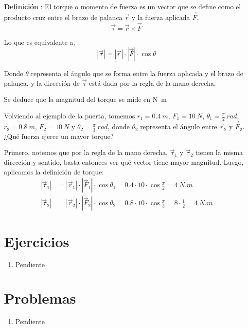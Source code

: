 \documentclass[letterpaper]{article}
\newcounter{definiciones}
\newcommand{\defii}{\stepcounter{definiciones} \textbf{Definición \thedefiniciones}: }
\newenvironment{defi}{\begin{framed} \defii}{\end{framed}}
\begin{document}
\begin{defi}
El torque o momento de fuerza es un vector que se define como el producto cruz entre el brazo de palanca $\vec{r}$ y la fuerza aplicada $\vec{F}$,
$$\vec{\tau} = \vec{r}\times\vec{F}$$

Lo que es equivalente a,
$$|\vec{\tau}| = |\vec{r}|\cdot|\vec{F}|\cdot\cos{\theta}$$

Donde $\theta$ representa el ángulo que se forma entre la fuerza aplicada y el brazo de palanca, y la dirección de $\vec{\tau}$ está dada por la regla de la mano derecha.

Se deduce que la magnitud del torque se mide en \si{N.m}
\end{defi}

Volviendo al ejemplo de la puerta, tomemos $r_1 = 0.4\ \si{m}$, $F_1 = 10\ \si{N}$, $\theta_1 = \frac\pi2\ \si{rad}$, $r_2 = 0.8\ \si{m}$, $F_2 = 10\ \si{N}$ y $\theta_2 = \frac\pi3\ \si{rad}$, donde $\theta_2$ representa el ángulo entre $\vec{r}_2$ y $\vec{F}_2$. ¿Qué fuerza ejerce un mayor torque?

Primero, notemos que por la regla de la mano derecha, $\vec{\tau}_1$ y $\vec{\tau}_2$ tienen la misma dirección y sentido, basta entonces ver qué vector tiene mayor magnitud. Luego, aplicamos la definición de torque:
\begin{align*}
|\vec{\tau}_1| &= |\vec{r}_1|\cdot|\vec{F}_1|\cdot\cos{\theta_1} = 0.4 \cdot 10 \cdot \cos{\frac\pi2} = 4\ \si{N.m} \\
|\vec{\tau}_2| &= |\vec{r}_2|\cdot|\vec{F}_2|\cdot\cos{\theta_2} = 0.8 \cdot 10 \cdot \cos{\frac\pi3} = 8\cdot\frac12 = 4\ \si{N.m}
\end{align*}





\section*{Ejercicios}

\begin{enumerate}

\item Pendiente

\end{enumerate}

\section*{Problemas}

\begin{enumerate}

\item Pendiente

\end{enumerate}
\end{document}
